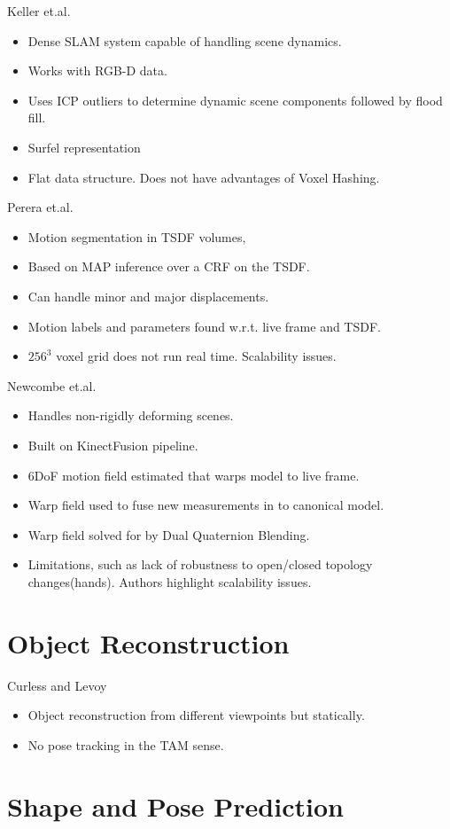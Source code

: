 Keller et.al. \cite{Keller2013}
\begin{itemize}
	\item Dense SLAM system capable of handling scene dynamics.
	\item Works with RGB-D data.
	\item Uses ICP outliers to determine dynamic scene components followed by flood fill.
	\item Surfel representation \cite{Pfister2000}
	\item Flat data structure. Does not have advantages of Voxel Hashing.
\end{itemize}

Perera et.al. \cite{Perera2015}
\begin{itemize}
	\item Motion segmentation in TSDF volumes,
	\item Based on MAP inference over a CRF on the TSDF.
	\item Can handle minor and major displacements.
	\item Motion labels and parameters found w.r.t. live frame and TSDF.
	\item $256^{3}$ voxel grid does not run real time. Scalability issues.
\end{itemize}

Newcombe et.al. \cite{Newcombe2015}
\begin{itemize}
	\item Handles non-rigidly deforming scenes.
	\item Built on KinectFusion pipeline.
	\item 6DoF motion field estimated that warps model to live frame.
	\item Warp field used to fuse new measurements in to canonical model.
	\item Warp field solved for by Dual Quaternion Blending. \cite{Kavan2006}
	\item Limitations, such as lack of robustness to open/closed topology changes(hands). Authors highlight scalability issues.
\end{itemize}

\section{Object Reconstruction}
\label{sec:lit_review_obj_recon}
Curless and Levoy \cite{Curless1996}
\begin{itemize}
	\item Object reconstruction from different viewpoints but statically.
	\item No pose tracking in the TAM sense.
\end{itemize}

\section{Shape and Pose Prediction}
\label{sec:lit_review_prediction}